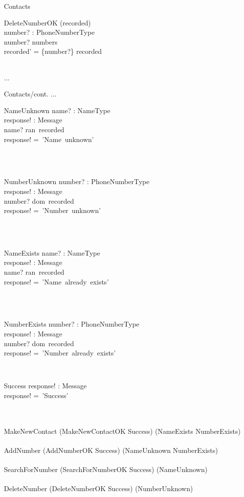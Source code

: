 \documentclass[12pt]{article}
\begin{document}
\begin{spacing}{1.5}
\begin{class}{Contacts}
\begin{op}{DeleteNumberOK}
\Delta (recorded) \\
number? : PhoneNumberType\\
\ST
number? \in numbers\\
recorded' = \{number?\} \ndres recorded \\
\end{op}\\
...
\end{class}
\newpage
\begin{class}{Contacts/cont.}
...
\also
\begin{op}{NameUnknown}
name? : NameType\\
response! : Message\\
\ST
name? \notin ran~recorded\\
response! =~'Name~unknown'
\end{op}\\
\\
\begin{op}{NumberUnknown}
number? : PhoneNumberType\\
response! : Message\\
\ST
number? \notin dom~recorded\\
response! =~'Number~unknown'
\end{op}\\
\\
\begin{op}{NameExists}
name? : NameType\\
response! : Message\\
\ST
name? \in ran~recorded\\
response! =~'Name~already~exists'
\end{op}\\
\\
\begin{op}{NumberExists}
number? : PhoneNumberType\\
response! : Message\\
\ST
number? \in dom~recorded\\
response! =~'Number~already~exists'
\end{op}\\
\begin{op}{Success}
response! : Message\\
\ST
response! =~'Success'
\end{op}\\
\mbox{}\\
MakeNewContact \sdef (MakeNewContactOK \land Success) \oplus (NameExists \lor NumberExists)  \\
\mbox{}\\
AddNumber \sdef (AddNumberOK \land Success) \oplus (NameUnknown \lor NumberExists)  \\
\mbox{}\\
SearchForNumber \sdef (SearchForNumberOK \land Success) \oplus (NameUnknown)  \\
\mbox{}\\
DeleteNumber \sdef (DeleteNumberOK \land Success) \oplus (NumberUnknown)  \\
\mbox{}\\
\end{class}
\newpage

\end{spacing}
\end{document}
